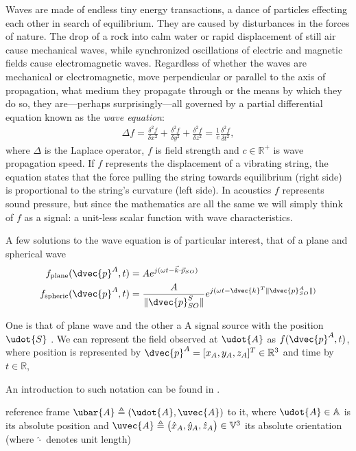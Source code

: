 {Waves are made of endless tiny energy transactions, a dance of particles effecting each other in search of equilibrium. They are caused by disturbances in the forces of nature. The drop of a rock into calm water or rapid displacement of still air cause mechanical waves, while synchronized oscillations of electric and magnetic fields cause electromagnetic waves. Regardless of whether the waves are mechanical or electromagnetic, move perpendicular or parallel to the axis of propagation, what medium they propagate through or the means by which they do so, they are---perhaps surprisingly---all governed by a partial differential equation known as the \emph{wave equation}:
%
\begin{align}
\Delta f = 
\frac{\delta^2 f}{\delta x^2} + \frac{\delta^2 f}{\delta y^2} + \frac{\delta^2 f}{\delta z^2} = \frac{1}{c}\frac{\delta^2 f}{\delta t^2},
\end{align}
%
where $\Delta$ is the Laplace operator, $f$ is field strength and $c\in\mathbb{R}^+$ is wave propagation speed. If $f$ represents the displacement of a vibrating string, the equation states that the force pulling the string towards equilibrium (right side) is proportional to the string's curvature (left side). In acoustics $f$ represents sound pressure, but since the mathematics are all the same we will simply think of $f$ as a signal: a unit-less scalar function with wave characteristics.

A few solutions to the wave equation is of particular interest, that of a plane and spherical wave
%
\begin{align}
f_\textrm{plane}(\dvec{p}^A,t)  &= A e^{j(\omega t - \vec{k} \cdot \vec{p}_{SO})} \\
f_\textrm{spheric}(\dvec{p}^A,t) &= \frac{A}{\lVert \dvec{p}_{SO}^S \rVert} e^{j(\omega t - \dvec{k}^T \lVert \dvec{p}_{SO}^A \rVert)}
\end{align}
% 


One is that of plane wave and the other a  A signal source with the position $\udot{S}$ . We can represent the field observed at $\udot{A}$ as $f(\dvec{p}^A,t)$, where position is represented by $\dvec{p}^A=[x_A,y_A,z_A]^T\in\mathbb{R}^3$ and time by $t\in\mathbb{R}$,

An introduction to such notation can be found in .


reference frame $\ubar{A} \triangleq (\udot{A},\uvec{A})$ to it, where $\udot{A}\in\mathbb{A}$ is its absolute position and $\uvec{A}\triangleq\big(\hat{x}_{A},\hat{y}_{A},\hat{z}_{A}\big)\in\mathbb{V}^3$ its absolute orientation (where $\hat{\cdot}$ denotes unit length)


}
